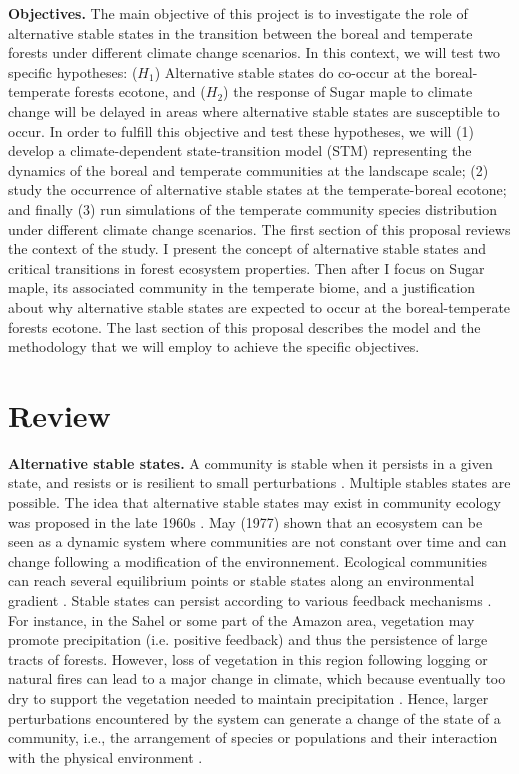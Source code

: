\textbf{Objectives.} The main objective of this project is to investigate the
role of alternative stable states in the transition between the boreal and temperate
forests under different climate change scenarios. In this context, we will
test two specific hypotheses: ($H_1$) Alternative stable states do co-occur at
the boreal-temperate forests ecotone, and ($H_2$) the response of Sugar maple
to climate change will be delayed in areas where alternative stable states are
susceptible to occur. In order to fulfill this objective and test these
hypotheses, we will (1) develop a climate-dependent state-transition model
(STM) representing the dynamics of the boreal and temperate communities at the
landscape scale; (2) study the occurrence of alternative stable states at the
temperate-boreal ecotone; and finally (3) run simulations of the temperate
community species distribution under different climate change scenarios. The
first section of this proposal reviews the context of the study. I present
the concept of alternative stable states and critical transitions in forest
ecosystem properties. Then after I focus on Sugar maple, its associated
community in the temperate biome, and a justification about why alternative
stable states are expected to occur at the boreal-temperate forests ecotone.
The last section of this proposal describes the model and the methodology that
we will employ to achieve the specific objectives.

\section{Review} 

\textbf{Alternative stable states.} A community is stable when it persists in a
given state, and resists or is resilient to small perturbations \cite{Filbee-Dexter2013}. 
Multiple stables states are possible. The idea that alternative
stable states may exist in community ecology was proposed in the late 1960s
\cite{Scheffer2001,Society2014a}.  May (1977) \cite{May1977} shown that an
ecosystem can be seen as a dynamic system where communities are not constant
over time and can change following a modification of the environnement.
Ecological communities can reach several equilibrium points or stable states
along an environmental gradient \cite{May1977}. Stable states can persist
according to various feedback mechanisms \cite{Filbee-Dexter2013}. For
instance, in the Sahel or some part of the Amazon area, vegetation may
promote precipitation (i.e. positive feedback) and thus the persistence of
large tracts of forests. However, loss of vegetation  in this region following
logging or natural fires can lead to a major change in climate, which because
eventually too dry to support the vegetation needed to maintain precipitation
\cite{scheffer2009critical}. Hence, larger perturbations encountered by the
system can generate a change of the state of a community, i.e., the arrangement
of species or populations and their interaction with the physical environment
\cite {Filbee-Dexter2013}.\\

